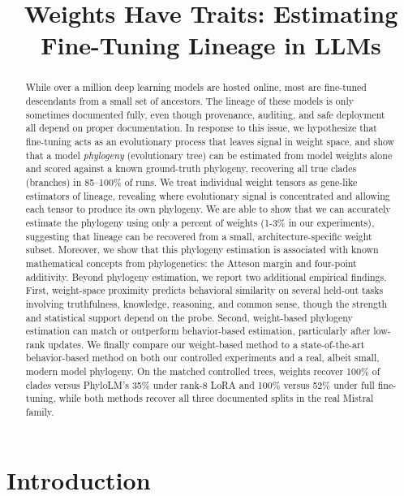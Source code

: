 \documentclass{article}
\title{Weights Have Traits: Estimating Fine-Tuning Lineage in LLMs}
\theoremstyle{definition}
\theoremstyle{plain}
\begin{document}
\maketitle

\begin{abstract}
While over a million deep learning models are hosted online, most are fine-tuned descendants from a small set of ancestors.  The lineage of these models is only sometimes documented fully, even though provenance, auditing, and safe deployment all depend on proper documentation. In response to this issue, we hypothesize that fine-tuning acts as an evolutionary process that leaves signal in weight space, and show that a model \textit{phylogeny} (evolutionary tree) can be estimated from model weights alone and scored against a known ground-truth phylogeny, recovering all true clades (branches) in 85--100\% of runs.  We treat individual weight tensors as gene-like estimators of lineage, revealing where evolutionary signal is concentrated and allowing each tensor to produce its own phylogeny.  We are able to show that we can accurately estimate the phylogeny using only a percent of weights (1-3\% in our experiments), suggesting that lineage can be recovered from a small, architecture-specific weight subset. Moreover, we show that this phylogeny estimation is associated with known mathematical concepts from phylogenetics: the Atteson margin and four-point additivity. Beyond phylogeny estimation, we report two additional empirical findings. First, weight-space proximity predicts behavioral similarity on several held-out tasks involving truthfulness, knowledge, reasoning, and common sense, though the strength and statistical support depend on the probe. Second, weight-based phylogeny estimation can match or outperform behavior-based estimation, particularly after low-rank updates. We finally compare our weight-based method to a state-of-the-art behavior-based method on both our controlled experiments and a real, albeit small, modern model phylogeny. On the matched controlled trees, weights recover 100\% of clades versus PhyloLM's 35\% under rank-8 LoRA and 100\% versus 52\% under full fine-tuning, while both methods recover all three documented splits in the real Mistral family.

\end{abstract}

\section{Introduction}
\label{sec:intro}
\end{document}

